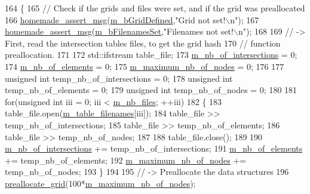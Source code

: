 \begin{DoxyCode}
164 \{
165     \textcolor{comment}{// Check if the grids and files were set, and if the grid was preallocated}
166     \hyperlink{common__header_8h_a593ccc80b790b2268653fcf6597bf451}{homemade\_assert\_msg}(\hyperlink{classcarl_1_1_stitch___meshes_a9bc08080ddc1f39ee4456aff9eeca725}{m\_bGridDefined},\textcolor{stringliteral}{"Grid not set!\(\backslash\)n"});
167     \hyperlink{common__header_8h_a593ccc80b790b2268653fcf6597bf451}{homemade\_assert\_msg}(\hyperlink{classcarl_1_1_stitch___meshes_a3f8957cc3d3184c5e3e4ba6d71c18d8f}{m\_bFilenamesSet},\textcolor{stringliteral}{"Filenames not set!\(\backslash\)n"});
168 
169     \textcolor{comment}{// -> First, read the intersection tables files, to get the grid hash}
170     \textcolor{comment}{//    function preallocation.}
171 
172     std::ifstream table\_file;
173     \hyperlink{classcarl_1_1_stitch___meshes_a764e63989a934f87105b5f978ec999f1}{m\_nb\_of\_intersections} = 0;
174     \hyperlink{classcarl_1_1_stitch___meshes_a4ed4ce7e9a185c3fd2bd92755888a37e}{m\_nb\_of\_elements} = 0;
175     \hyperlink{classcarl_1_1_stitch___meshes_a5583a82a08d9560d4b7bf2c1c3c9b815}{m\_maximum\_nb\_of\_nodes} = 0;
176 
177     \textcolor{keywordtype}{unsigned} \textcolor{keywordtype}{int} temp\_nb\_of\_intersections = 0;
178     \textcolor{keywordtype}{unsigned} \textcolor{keywordtype}{int} temp\_nb\_of\_elements = 0;
179     \textcolor{keywordtype}{unsigned} \textcolor{keywordtype}{int} temp\_nb\_of\_nodes = 0;
180 
181     \textcolor{keywordflow}{for}(\textcolor{keywordtype}{unsigned} \textcolor{keywordtype}{int} iii = 0; iii < \hyperlink{classcarl_1_1_stitch___meshes_a01c131c2e0c83ef1642326f6ea4f97d2}{m\_nb\_files}; ++iii)
182     \{
183         table\_file.open(\hyperlink{classcarl_1_1_stitch___meshes_a45f392e103d8b859857981971165dc0d}{m\_table\_filenames}[iii]);
184         table\_file >> temp\_nb\_of\_intersections;
185         table\_file >> temp\_nb\_of\_elements;
186         table\_file >> temp\_nb\_of\_nodes;
187 
188         table\_file.close();
189 
190         \hyperlink{classcarl_1_1_stitch___meshes_a764e63989a934f87105b5f978ec999f1}{m\_nb\_of\_intersections} += temp\_nb\_of\_intersections;
191         \hyperlink{classcarl_1_1_stitch___meshes_a4ed4ce7e9a185c3fd2bd92755888a37e}{m\_nb\_of\_elements} += temp\_nb\_of\_elements;
192         \hyperlink{classcarl_1_1_stitch___meshes_a5583a82a08d9560d4b7bf2c1c3c9b815}{m\_maximum\_nb\_of\_nodes} += temp\_nb\_of\_nodes;
193     \}
194 
195     \textcolor{comment}{// -> Preallocate the data structures}
196     \hyperlink{classcarl_1_1_stitch___meshes_a4c75b75cd9c0e5d80e6f250df01dc246}{preallocate\_grid}(100*\hyperlink{classcarl_1_1_stitch___meshes_a5583a82a08d9560d4b7bf2c1c3c9b815}{m\_maximum\_nb\_of\_nodes});

\end{DoxyCode}
